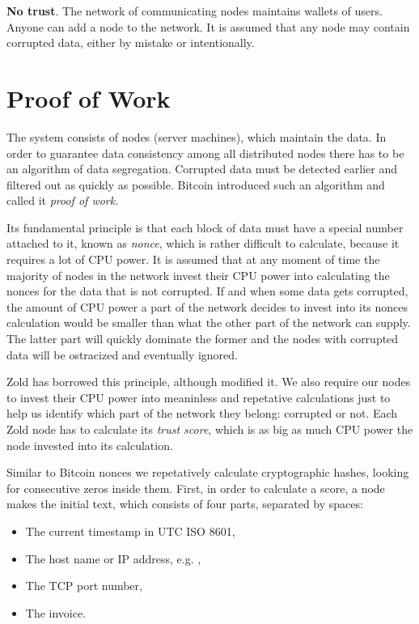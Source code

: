 \documentclass[11pt,oneside]{article}
\begin{document}
\textbf{No trust}.
The network of communicating nodes maintains wallets of users.
Anyone can add a node to the network.
It is assumed that any node may contain corrupted data, either by mistake or intentionally.

\section{Proof of Work}

The system consists of nodes (server machines), which maintain the data.
In order to guarantee data consistency among all distributed nodes
there has to be an algorithm of data segregation.
Corrupted data must be detected earlier and filtered out as quickly as possible.
Bitcoin introduced such an algorithm and called it \emph{proof of work}.

Its fundamental principle is that each block of data must have a special
number attached to it, known as \emph{nonce}, which is rather difficult to calculate,
because it requires a lot of CPU power. It is assumed that at any moment
of time the majority of nodes in the network invest their CPU power into
calculating the nonces for the data that is not corrupted. If and when
some data gets corrupted, the amount of CPU power a part of the network
decides to invest into its nonces calculation would be smaller than what
the other part of the network can supply. The latter part
will quickly dominate the former and the nodes with corrupted data will
be ostracized and eventually ignored.

Zold has borrowed this principle, although modified it. We also require
our nodes to invest their CPU power into meaninless and repetative
calculations just to help us identify which part of the network they belong:
corrupted or not. Each Zold node has to calculate its \emph{trust score},
which is as big as much CPU power the node invested into its calculation.

Similar to Bitcoin nonces we repetatively calculate cryptographic hashes,
looking for consecutive zeros inside them. First, in order to calculate a score,
a node makes the initial text, which consists of four parts,
separated by spaces:

\begin{itemize}
\item The current timestamp in UTC ISO 8601,
\item The host name or IP address, e.g. ,
\item The TCP port number,
\item The invoice.
\end{itemize}
\end{document}
